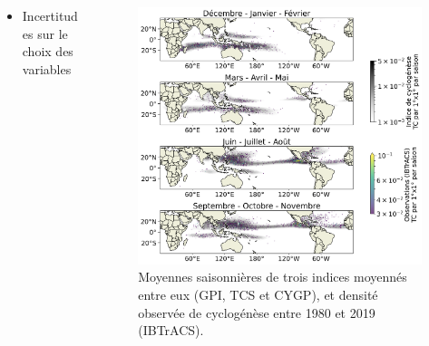 \documentclass[aspectratio=169, usepdftitle=false, xcolor={dvipsnames}, 9pt,table]{beamer}
\begin{document}
\begin{frame}[t]
\begin{columns}[t]
\begin{column}{0.5\textwidth}
\begin{columns}[t]
\begin{column}{0.5\textwidth}
{\begin{alertblock}[Inconvénients]
\begin{itemize}
                                \vspace{1ex}
                                \item Incertitudes sur le choix des variables
                            \end{itemize}
                        \end{alertblock}
                    }
                \end{column}
            \end{columns}
        \end{column}
        \begin{column}{0.5\textwidth}
            \vspace{-3em}
            \begin{figure}
                \centering
                \includegraphics[width=\textwidth]{Figures/acgi_mean_IBTrACS_season.png}
                \caption{Moyennes saisonnières de trois indices moyennés entre eux (GPI, TCS et CYGP), et densité observée de cyclogénèse entre 1980 et 2019
                (IBTrACS).}
            \end{figure}        
        \end{column}
    \end{columns}
\end{frame}

\end{document}
